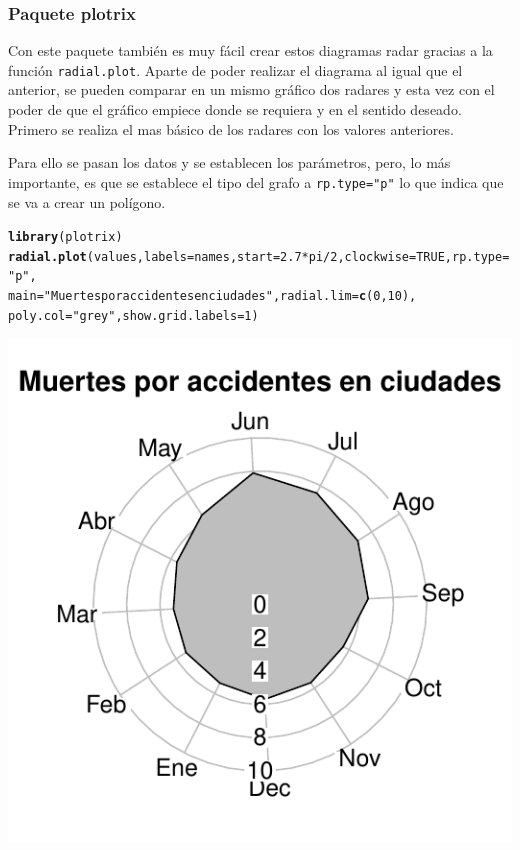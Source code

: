 \documentclass{article}\usepackage[]{graphicx}\usepackage[]{color}
\makeatletter
\def\maxwidth{ %
  \ifdim\Gin@nat@width>\linewidth
    \linewidth
  \else
    \Gin@nat@width
  \fi
}
\newcommand{\hlnum}[1]{\textcolor[rgb]{0.686,0.059,0.569}{#1}}%
\newcommand{\hlstr}[1]{\textcolor[rgb]{0.192,0.494,0.8}{#1}}%
\newcommand{\hlopt}[1]{\textcolor[rgb]{0,0,0}{#1}}%
\newcommand{\hlstd}[1]{\textcolor[rgb]{0.345,0.345,0.345}{#1}}%
\newcommand{\hlkwc}[1]{\textcolor[rgb]{0.333,0.667,0.333}{#1}}%
\newcommand{\hlkwd}[1]{\textcolor[rgb]{0.737,0.353,0.396}{\textbf{#1}}}%
\newenvironment{kframe}{%
 \def\at@end@of@kframe{}%
 \ifinner\ifhmode%
  \def\at@end@of@kframe{\end{minipage}}%
  \begin{minipage}{\columnwidth}%
 \fi\fi%
 \def\FrameCommand##1{\hskip\@totalleftmargin \hskip-\fboxsep
 \colorbox{shadecolor}{##1}\hskip-\fboxsep
     \hskip-\linewidth \hskip-\@totalleftmargin \hskip\columnwidth}%
 \MakeFramed {\advance\hsize-\width
   \@totalleftmargin\z@ \linewidth\hsize
   \@setminipage}}%
 {\par\unskip\endMakeFramed%
 \at@end@of@kframe}
\newenvironment{knitrout}{}{} %
\makeatother
\begin{document}
\subsubsection{Paquete plotrix}
Con este paquete \cite{docu_plotrix}
tambi\'en es muy f\'acil crear estos diagramas radar gracias a la funci\'on \texttt{radial.plot}. Aparte de poder realizar el diagrama al igual que el anterior, se pueden comparar en un mismo gr\'afico dos radares y esta vez con el poder de que el gr\'afico empiece donde se requiera y en el sentido deseado.~\\
Primero se realiza el mas b\'asico de los radares con los valores anteriores.


Para ello se pasan los datos y se establecen los par\'ametros, pero, lo m\'as importante, es que se establece el tipo del grafo a \texttt{rp.type="p"} lo que indica que se va a crear un pol\'igono.
\begin{knitrout}
\color{fgcolor}\begin{kframe}
\begin{alltt}
\hlkwd{library}\hlstd{(plotrix)}
\hlkwd{radial.plot}\hlstd{(values,}\hlkwc{labels}\hlstd{=names,} \hlkwc{start} \hlstd{=} \hlnum{2.7}\hlopt{*}\hlstd{pi}\hlopt{/}\hlnum{2}\hlstd{,} \hlkwc{clockwise} \hlstd{=} \hlnum{TRUE}\hlstd{,}\hlkwc{rp.type}\hlstd{=}\hlstr{"p"}\hlstd{,}
            \hlkwc{main}\hlstd{=}\hlstr{"Muertes por accidentes en ciudades"}\hlstd{,}\hlkwc{radial.lim}\hlstd{=}\hlkwd{c}\hlstd{(}\hlnum{0}\hlstd{,}\hlnum{10}\hlstd{),}
            \hlkwc{poly.col}\hlstd{=}\hlstr{"grey"}\hlstd{,}\hlkwc{show.grid.labels}\hlstd{=}\hlnum{1}\hlstd{)}
\end{alltt}
\end{kframe}

{\centering \includegraphics[width=\maxwidth]{figure/plot_plotrix_1-1} 

}



\end{knitrout}
\end{document}
